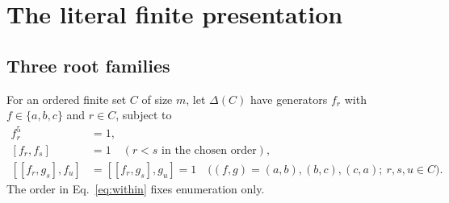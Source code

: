 \section{The literal finite presentation}\label{sec:presentation}

\subsection{Three root families}
For an ordered finite set $C$ of size $m$, let $\Delta(C)$ have generators
$f_r$ with $f\in\{a,b,c\}$ and $r\in C$, subject to
\begin{align}
 f_r^5&=1,\label{eq:fifth}\\
 [f_r,f_s]&=1\quad(r<s\text{ in the chosen order}),\label{eq:within}\\
 [[f_r,g_s],f_u]&=[[f_r,g_s],g_u]=1
 \quad\bigl((f,g)=(a,b),(b,c),(c,a);\ r,s,u\in C\bigr).
 \label{eq:class-two}
\end{align}
The order in Eq.~\eqref{eq:within} fixes enumeration only.

